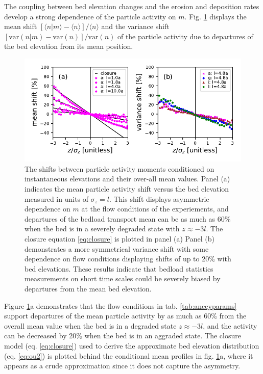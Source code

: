 The coupling between bed elevation changes and the erosion and deposition rates develop a strong dependence of the particle activity on $m$. Fig. \ref{fig:condmoms} displays the mean shift $[\langle n |m \rangle - \langle n \rangle]/\langle n \rangle $ and the variance shift  $[\text{var}(n|m) - \text{var}(n)]/\text{var}(n)$ of the particle activity due to departures of the bed elevation from its mean position.
\begin{figure}[!htbp]
	\includegraphics[width=\linewidth,keepaspectratio]{./figures/ch3/momentsuppression.pdf}
	\caption{The shifts between particle activity moments conditioned on instantaneous elevations and their over-all mean values. Panel (a) indicates the mean particle activity shift versus the bed elevation measured in units of $\sigma_z=l$. This shift displays asymmetric dependence on $m$ at the flow conditions of the \citet{Ancey2008} experiements, and departures of the bedload transport mean can be as much as 60\% when the bed is in a severely degraded state with $z\approx -3l$. The closure equation \ref{eq:closure} is plotted in panel (a) Panel (b) demonstrates a more symmetrical variance shift with some dependence on flow conditions displaying shifts of up to 20\% with bed elevations. These results indicate that bedload statistics measurements on short time scales could be severely biased by departures from the mean bed elevation.}
	\label{fig:condmoms}
\end{figure}
Figure \ref{fig:condmoms}a demonstrates that the flow conditions in tab. \ref{tab:anceyparams} support departures of the mean particle activity by as much as 60\% from the overall mean value when the bed is in a degraded state $z\approx -3l$, and the activity can be decreased by 20\% when the bed is in an aggraded state.
The closure model (eq. \ref{eq:closure}) used to derive the approximate bed elevation distribution (eq. \ref{eq:ou2}) is plotted behind the conditional mean profiles in fig. \ref{fig:condmoms}a, where it appears as a crude approximation since it does not capture the asymmetry.
